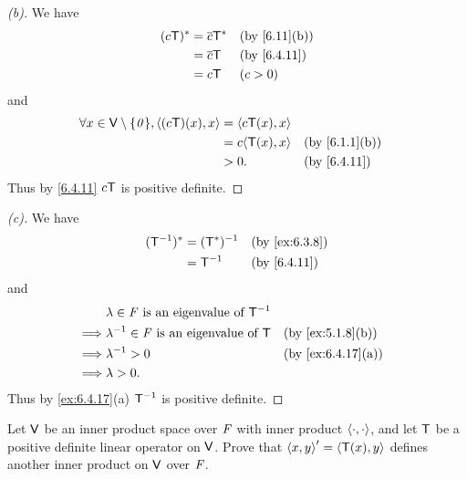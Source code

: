 \begin{proof}[(b)]
  We have
  \begin{align*}
    (c\T)^* & = \conj{c} \T^* &  & \text{(by \cref{6.11}(b))} \\
            & = \conj{c} \T   &  & \text{(by \cref{6.4.11})}  \\
            & = c \T          &  & (c > 0)
  \end{align*}
  and
  \begin{align*}
    \forall x \in \V \setminus \set{\zv}, \inn{(c \T)(x), x} & = \inn{c \T(x), x}                                  \\
                                                             & = c \inn{\T(x), x} &  & \text{(by \cref{6.1.1}(b))} \\
                                                             & > 0.               &  & \text{(by \cref{6.4.11})}
  \end{align*}
  Thus by \cref{6.4.11} \(c \mathsf{T}\) is positive definite.
\end{proof}

\begin{proof}[(c)]
  We have
  \begin{align*}
    (\T^{-1})^* & = (\T^*)^{-1} &  & \text{(by \cref{ex:6.3.8})} \\
                & = \T^{-1}     &  & \text{(by \cref{6.4.11})}
  \end{align*}
  and
  \begin{align*}
             & \lambda \in \F \text{ is an eigenvalue of } \T^{-1}                                      \\
    \implies & \lambda^{-1} \in \F \text{ is an eigenvalue of } \T &  & \text{(by \cref{ex:5.1.8}(b))}  \\
    \implies & \lambda^{-1} > 0                                    &  & \text{(by \cref{ex:6.4.17}(a))} \\
    \implies & \lambda > 0.
  \end{align*}
  Thus by \cref{ex:6.4.17}(a) \(\mathsf{T}^{-1}\) is positive definite.
\end{proof}

\begin{ex}\label{ex:6.4.20}
  Let \(\mathsf{V}\) be an inner product space over \(\mathit{F}\) with inner product \(\left\langle\cdot, \cdot\right\rangle\), and let \(\mathsf{T}\) be a positive definite linear operator on \(\mathsf{V}\).
  Prove that \(\left\langle x, y\right\rangle' = \left\langle\mathsf{T}(x), y\right\rangle\) defines another inner product on \(\mathsf{V}\) over \(\mathit{F}\).
\end{ex}


